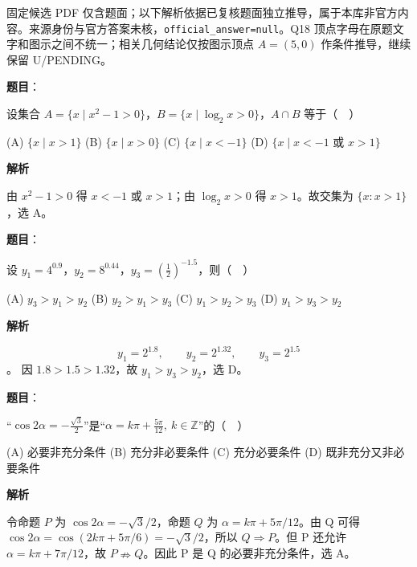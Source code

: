 

\begin{gktip}
固定候选 PDF 仅含题面；以下解析依据已复核题面独立推导，属于本库非官方内容。来源身份与官方答案未核，\texttt{official_answer=null}。Q18 顶点字母在原题文字和图示之间不统一；相关几何结论仅按图示顶点 \(A=(5,0)\) 作条件推导，继续保留 U/PENDING。
\end{gktip}


\begin{answer}

\textbf{题目}：

设集合 \(A=\{x\mid x^2-1>0\}\)，\(B=\{x\mid \log_2x>0\}\)，\(A\cap B\) 等于（　）

    (A) \(\{x\mid x>1\}\)
    (B) \(\{x\mid x>0\}\)
    (C) \(\{x\mid x<-1\}\)
    (D) \(\{x\mid x<-1\text{ 或 }x>1\}\)

\textbf{解析}

由 \(x^2-1>0\) 得 \(x<-1\) 或 \(x>1\)；由 \(\log_2x>0\) 得 \(x>1\)。故交集为 \(\{x:x>1\}\)，选 A。


\end{answer}
\begin{answer}

\textbf{题目}：

设 \(y_1=4^{0.9}\)，\(y_2=8^{0.44}\)，\(y_3=\left(\frac12\right)^{-1.5}\)，则（　）

    (A) \(y_3>y_1>y_2\)
    (B) \(y_2>y_1>y_3\)
    (C) \(y_1>y_2>y_3\)
    (D) \(y_1>y_3>y_2\)

\textbf{解析}

\nopagebreak[4]
\[
y_1=2^{1.8},\qquad y_2=2^{1.32},\qquad y_3=2^{1.5}
\]
。
因 \(1.8>1.5>1.32\)，故 \(y_1>y_3>y_2\)，选 D。


\end{answer}
\begin{answer}

\textbf{题目}：

“\(\cos 2\alpha=-\frac{\sqrt3}{2}\)”是“\(\alpha=k\pi+\frac{5\pi}{12},\ k\in\mathbb Z\)”的（　）

    (A) 必要非充分条件
    (B) 充分非必要条件
    (C) 充分必要条件
    (D) 既非充分又非必要条件

\textbf{解析}

令命题 \(P\) 为 \(\cos2\alpha=-\sqrt3/2\)，命题 \(Q\) 为 \(\alpha=k\pi+5\pi/12\)。由 Q 可得 \(\cos2\alpha=\cos(2k\pi+5\pi/6)=-\sqrt3/2\)，所以 \(Q\Rightarrow P\)。但 P 还允许 \(\alpha=k\pi+7\pi/12\)，故 \(P\nRightarrow Q\)。因此 P 是 Q 的必要非充分条件，选 A。


\end{answer}
